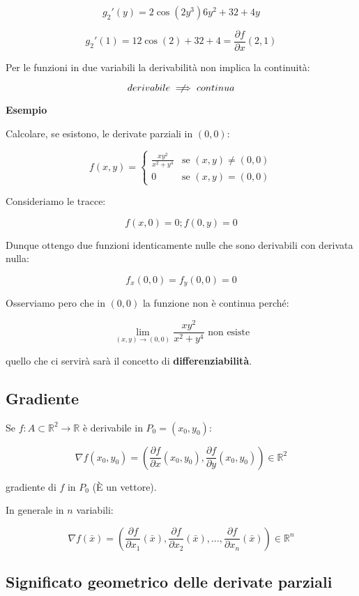 \documentclass[11pt]{article}
\begin{document}
\[
    g_2'(y) = 2 \cos(2y^{3}) 6y^{2} + 32 + 4y
\]

\[
    g_2'(1) = 12 \cos(2) + 32 + 4 = \frac{\partial f}{\partial x}(2,1)
\]


Per le funzioni in due variabili la derivabilità non implica la continuità:

\[
    derivabile \centernot\implies continua
\]

\textbf{Esempio} 

Calcolare, se esistono, le derivate parziali in $(0,0)$:


    \[
        f(x,y)=
     \begin{cases}
        \frac{xy^{2}}{x^{2}+y^{4}} & \text{se $(x,y)\neq (0,0)$} \\
        0 & \text{se $(x,y)=(0,0)$}
    \end{cases}
    \]

Consideriamo le tracce:

\[
    f(x,0) = 0 ; f(0,y) =0
\]

Dunque ottengo due funzioni identicamente nulle che sono derivabili con derivata nulla:

\[
    f_x(0,0) = f_y(0,0) = 0
\]

Osserviamo pero che in $(0,0)$ la funzione non è continua perché:

\[
    \lim_{ (x,y) \to (0,0) } \frac{xy^{2}}{x^{2}+y^{4}} \text{ non esiste}
\]

quello che ci servirà sarà il concetto di \textbf{differenziabilità}.

\subsection{Gradiente}

Se $f: A \subset \mathbb{R}^{2}\rightarrow \mathbb{R}$ è derivabile in $P_0=(x_0,y_0)$:

\[
    \nabla f(x_0,y_0)=(\frac{\partial f}{\partial x}(x_0,y_0), \frac{\partial f}{\partial y}(x_0,y_0)) \in \mathbb{R}^{2}
\]

gradiente di $f$ in $P_0$ (È un vettore).

In generale in $n$ variabili:

\[
    \nabla f(\bar{x} ) = (\frac{\partial f}{\partial x_1}(\bar{x} ), \frac{\partial f}{\partial x_2}(\bar{x} ), \ldots , \frac{\partial f}{\partial x_n}(\bar{x} )) \in \mathbb{R}^{n}
\]

\subsection{Significato geometrico delle derivate parziali}
\end{document}
